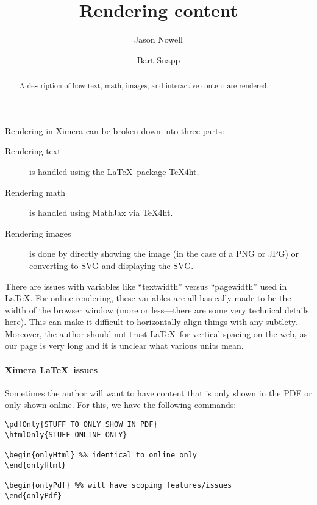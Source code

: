 \documentclass{ximera}
\title{Rendering content}
\author{Jason Nowell \and Bart Snapp}
\begin{document}
\begin{abstract}
    A description of how text, math, images, and interactive content are
    rendered.
\end{abstract}
\maketitle

Rendering in Ximera can be broken down into three parts:
\begin{description}
    \item[Rendering text] is handled using the \LaTeX\ package TeX4ht.
    \item[Rendering math] is handled using MathJax via TeX4ht.
    \item[Rendering images] is done by directly showing the image (in the case
        of a PNG or JPG) or converting to SVG and displaying the SVG.
\end{description}


There are issues with variables like ``textwidth'' versus
``pagewidth'' used in \LaTeX. For online rendering, these variables are all
basically made to be the width of the browser window (more or less---there are
some very technical details here). This can make it difficult to horizontally
align things with any subtlety. Moreover, the author should not trust \LaTeX\ for vertical spacing on the web, as our page is very long and it is unclear what various units mean.



\paragraph{Ximera \LaTeX\ issues}


Sometimes the author will want to have content that is only shown in the PDF or only
shown online. For this, we have the following commands:
\begin{verbatim}
\pdfOnly{STUFF TO ONLY SHOW IN PDF}
\htmlOnly{STUFF ONLINE ONLY}

\begin{onlyHtml} %% identical to online only
\end{onlyHtml}

\begin{onlyPdf} %% will have scoping features/issues
\end{onlyPdf}
\end{verbatim}
\end{document}

